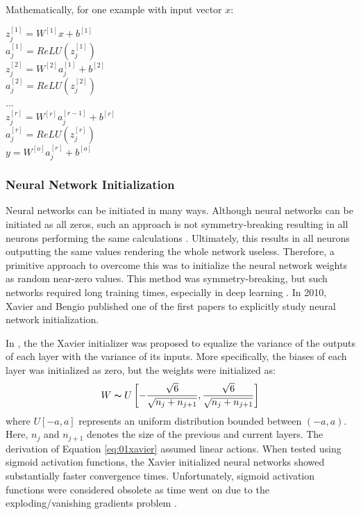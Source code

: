Mathematically, for one example with input vector $x$:
\begin{center}
    $z^{[1]}_j = W^{[1]}x + b^{[1]}$ \\
    $a^{[1]}_j = ReLU(z^{[1]}_j)$ \\
    $z^{[2]}_j = W^{[2]}a^{[1]}_j + b^{[2]}$ \\
    $a^{[2]}_j = ReLU(z^{[2]}_j)$ \\
    ... \\
    $z^{[r]}_j = W^{[r]}a^{[r - 1]}_j + b^{[r]}$ \\
    $a^{[r]}_j = ReLU(z^{[r]}_j)$ \\
    $y = W^{[o]}a^{[r]}_j + b^{[o]}$ \\  
\end{center}




\subsubsection{Neural Network Initialization}
Neural networks can be initiated in many ways. Although neural networks can be initiated as all zeros, such an approach is not symmetry-breaking resulting in all neurons performing the same calculations \cite{NN}.  Ultimately, this results in all neurons outputting the same values rendering the whole network useless.  Therefore, a primitive approach to overcome this was to initialize the neural network weights as random near-zero values. This method was symmetry-breaking, but such networks required long training times, especially in deep learning \cite{xavier_init}. In 2010, Xavier and Bengio published one of the first papers to explicitly study neural network initialization.

In \cite{xavier_init}, the the Xavier initializer was proposed to equalize the variance of the outputs of each layer with the variance of its inputs. More specifically, the biases of each layer was initialized as zero, but the weights were initialized as:
\begin{equation}
    W \thicksim U \left[-\frac{\sqrt{6}}{\sqrt{n_j + n_{j+1}}}, \frac{\sqrt{6}}{\sqrt{n_j + n_{j+1}}}  \right]
    \label{eq:01xavier}
\end{equation}
where $U[-a, a]$ represents an uniform distribution bounded between $(-a, a)$.  Here, $n_j$ and $n_{j+1}$ denotes the size of the previous and current layers. The derivation of Equation \ref{eq:01xavier} assumed linear actions. When tested using sigmoid activation functions, the Xavier initialized neural networks showed substantially faster convergence times. Unfortunately, sigmoid activation functions were considered obsolete as time went on due to the exploding/vanishing gradients problem \cite{vanish_grad}.  

